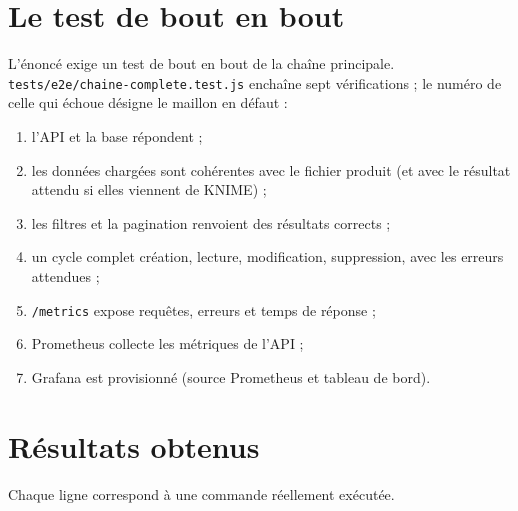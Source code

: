 \section{Le test de bout en bout}
L'énoncé exige un test de bout en bout de la chaîne principale. \nolinkurl{tests/e2e/chaine-complete.test.js}
enchaîne sept vérifications ; le numéro de celle qui échoue désigne le maillon en défaut :
\begin{enumerate}
  \item l'API et la base répondent ;
  \item les données chargées sont cohérentes avec le fichier produit (et avec le résultat attendu si elles viennent de KNIME) ;
  \item les filtres et la pagination renvoient des résultats corrects ;
  \item un cycle complet création, lecture, modification, suppression, avec les erreurs attendues ;
  \item \texttt{/metrics} expose requêtes, erreurs et temps de réponse ;
  \item Prometheus collecte les métriques de l'API ;
  \item Grafana est provisionné (source Prometheus et tableau de bord).
\end{enumerate}


\section{Résultats obtenus}
Chaque ligne correspond à une commande réellement exécutée.

